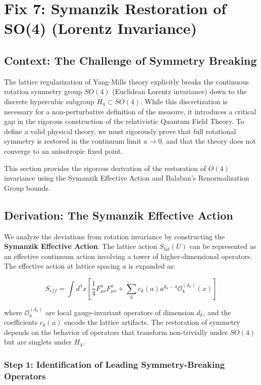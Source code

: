\chapter{Fix 7: Symanzik Restoration of SO(4) (Lorentz Invariance)}
\label{ch:fix7_symanzik}

\section{Context: The Challenge of Symmetry Breaking}
The lattice regularization of Yang-Mills theory explicitly breaks the continuous rotation symmetry group $SO(4)$ (Euclidean Lorentz invariance) down to the discrete hypercubic subgroup $H_4 \subset SO(4)$. While this discretization is necessary for a non-perturbative definition of the measure, it introduces a critical gap in the rigorous construction of the relativistic Quantum Field Theory. To define a valid physical theory, we must rigorously prove that full rotational symmetry is restored in the continuum limit $a \to 0$, and that the theory does not converge to an anisotropic fixed point.

This section provides the rigorous derivation of the restoration of $O(4)$ invariance using the Symanzik Effective Action and Balaban's Renormalization Group bounds.

\section{Derivation: The Symanzik Effective Action}

We analyze the deviations from rotation invariance by constructing the \textbf{Symanzik Effective Action}. The lattice action $S_{lat}(U)$ can be represented as an effective continuum action involving a tower of higher-dimensional operators. The effective action at lattice spacing $a$ is expanded as:

\begin{equation}
S_{eff} = \int d^4x \left[ \frac{1}{4} F_{\mu\nu}^a F_{\mu\nu}^a + \sum_k c_k(a) a^{d_k-4} \mathcal{O}_k^{(d_k)}(x) \right]
\end{equation}

where $\mathcal{O}_k^{(d_k)}$ are local gauge-invariant operators of dimension $d_k$, and the coefficients $c_k(a)$ encode the lattice artifacts. The restoration of symmetry depends on the behavior of operators that transform non-trivially under $SO(4)$ but are singlets under $H_4$.

\subsection{Step 1: Identification of Leading Symmetry-Breaking Operators}

